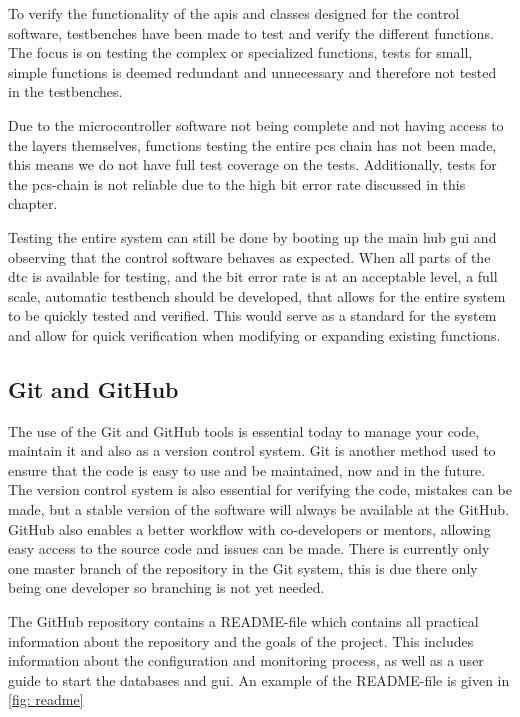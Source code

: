 \documentclass[main.tex]{subfiles}
\begin{document}
To verify the functionality of the \gls{api}s and classes designed for the control software, testbenches have been made to test and verify the different functions. The focus is on testing the complex or specialized functions, tests for small, simple functions is deemed redundant and unnecessary and therefore not tested in the testbenches.

Due to the microcontroller software not being complete and not having access to the layers themselves, functions testing the entire \gls{pcs} chain has not been made, this means we do not have full test coverage on the tests. Additionally, tests for the \gls{pcs}-chain is not reliable due to the high bit error rate discussed in this chapter.

Testing the entire system can still be done by booting up the main hub \gls{gui} and observing that the control software behaves as expected. When all parts of the \gls{dtc} is available for testing, and the bit error rate is at an acceptable level, a full scale, automatic testbench should be developed, that allows for the entire system to be quickly tested and verified. This would serve as a standard for the system and allow for quick verification when modifying or expanding existing functions.

\subsection{Git and GitHub}

The use of the Git and GitHub tools is essential today to manage your code, maintain it and also as a version control system. Git is another method used to ensure that the code is easy to use and be maintained, now and in the future. The version control system is also essential for verifying the code, mistakes can be made, but a stable version of the software will always be available at the GitHub. GitHub also enables a better workflow with co-developers or mentors, allowing easy access to the source code and issues can be made. There is currently only one master branch of the repository in the Git system, this is due there only being one developer so branching is not yet needed.

The GitHub repository contains a README-file which contains all practical information about the repository and the goals of the project. This includes information about the configuration and monitoring process, as well as a user guide to start the databases and \gls{gui}. An example of the README-file is given in \autoref{fig: readme}
\end{document}
